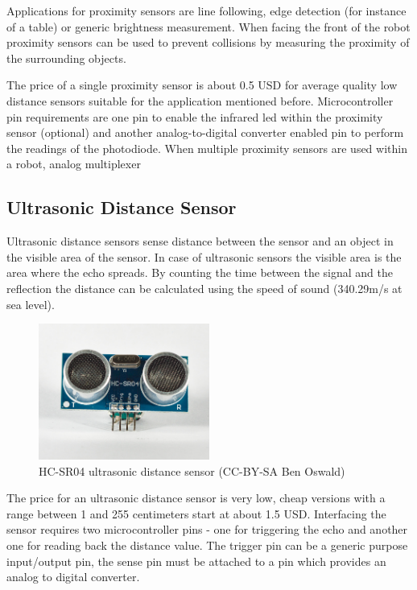 Applications for proximity sensors are line following, edge detection (for instance of a table) or generic brightness measurement. When facing the front of the robot proximity sensors can be used to prevent collisions by measuring the proximity of the surrounding objects.

The price of a single proximity sensor is about 0.5 USD for average quality low distance sensors suitable for the application mentioned before. Microcontroller pin requirements are one pin to enable the infrared led within the proximity sensor (optional) and another analog-to-digital converter enabled pin to perform the readings of the photodiode. When multiple proximity sensors are used within a robot, analog multiplexer 

\subsection{Ultrasonic Distance Sensor}
Ultrasonic distance sensors sense distance between the sensor and an object in the visible area of the sensor. In case of ultrasonic sensors the visible area is the area where the echo spreads. By counting the time between the signal and the reflection the distance can be calculated using the speed of sound (340.29m/s at sea level). 

\begin{figure}[H]
  \centering
  \includegraphics[width=0.5\textwidth]{images/30_ultrasonic.jpg}
  \caption{HC-SR04 ultrasonic distance sensor (CC-BY-SA Ben Oswald)}
\end{figure}

The price for an ultrasonic distance sensor is very low, cheap versions with a range between 1 and 255 centimeters start at about 1.5 USD. Interfacing the sensor requires two microcontroller pins - one for triggering the echo and another one for reading back the distance value. The trigger pin can be a generic purpose input/output pin, the sense pin must be attached to a pin which provides an analog to digital converter.

